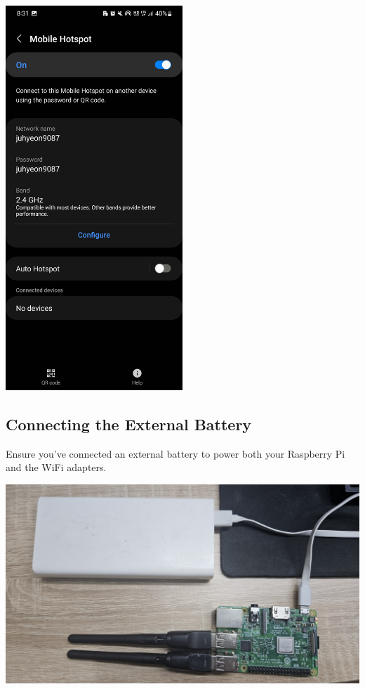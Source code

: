 \documentclass[
  letterpaper,
]{scrbook}
\begin{document}
\includegraphics[width=0.5\textwidth,height=\textheight]{content/material/ch2/turnon_hotspot.jpg}

\hypertarget{connecting-the-external-battery}{%
\subsection{Connecting the External
Battery}\label{connecting-the-external-battery}}

Ensure you've connected an external battery to power both your Raspberry
Pi and the WiFi adapters.

\includegraphics{content/material/ch2/plug_external.jpg}
\end{document}
